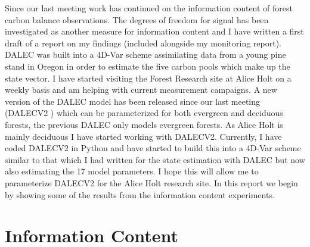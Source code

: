 \documentclass[11pt]{article}
\begin{document}
Since our last meeting work has continued on the information content of forest carbon balance observations. The degrees of freedom for signal has been investigated as another measure for information content and I have written a first draft of a report on my findings (included alongside my monitoring report). DALEC was built into a 4D-Var scheme assimilating data from a young pine stand in Oregon in order to estimate the five carbon pools which make up the state vector. I have started visiting the Forest Research site at Alice Holt on a weekly basis and am helping with current measurement campaigns. A new version of the DALEC model has been released since our last meeting (DALECV2 \cite{Bloom2014}) which can be parameterized for both evergreen and deciduous forests, the previous DALEC only models evergreen forests. As Alice Holt is mainly deciduous I have started working with DALECV2. Currently, I have coded DALECV2 in Python and have started to build this into a 4D-Var scheme similar to that which I had written for the state estimation with DALEC but now also estimating the 17 model parameters. I hope this will allow me to parameterize DALECV2 for the Alice Holt research site. In this report we begin by showing some of the results from the information content experiments.

\section{Information Content}
\end{document}
